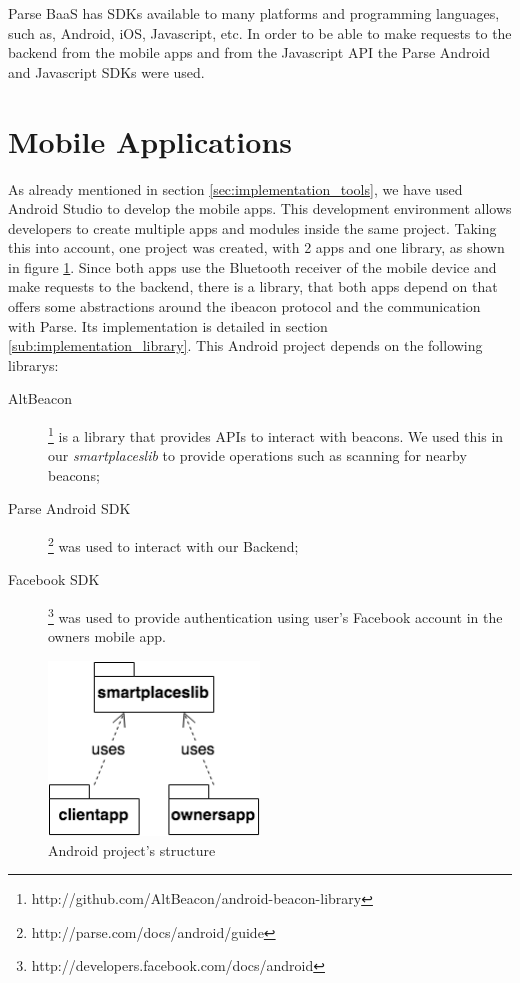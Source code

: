 Parse \gls{BaaS} has \glspl{SDK} available to many platforms and programming
languages, such as, Android, iOS, Javascript, etc.
In order to be able to make requests to the backend from the mobile apps and
from the Javascript API
the Parse Android and Javascript \glspl{SDK} were used.

\section{Mobile Applications}
\label{sec:implementation_mobile_applications}
As already mentioned in section \ref{sec:implementation_tools}, we have used Android Studio to develop the mobile apps.
This development environment allows developers to create multiple
apps and modules inside the same project.
Taking this into account,
one project was created, with 2 apps and one library, as shown in figure
\ref{fig:smartplaces_package}. Since both apps use the Bluetooth receiver
of the mobile device and make requests to the backend, there is a library,
that both apps depend on that offers some abstractions around the ibeacon
protocol and the communication with Parse.
Its implementation is detailed in section \ref{sub:implementation_library}.
This Android project depends on the following librarys:
\begin{description}
  \item[AltBeacon]\footnote{http://github.com/AltBeacon/android-beacon-library}
  is a library that provides \glspl{API} to interact with beacons.
  We used this in our \emph{smartplaceslib} to provide operations such as scanning for nearby beacons;
  \item[Parse Android \gls{SDK}]\footnote{http://parse.com/docs/android/guide}
  was used to interact with our Backend;
  \item[Facebook \gls{SDK}]\footnote{http://developers.facebook.com/docs/android}
  was used to provide authentication using user's Facebook account in the owners mobile app.
\end{description}

\begin{figure}[!ht]
  \centering
    \includegraphics[width=0.5\textwidth, height=0.15\textheight,
      keepaspectratio]{images/smartplaces_package}
    \caption[Android project structure]{Android project's structure}
    \label{fig:smartplaces_package}
\end{figure}

